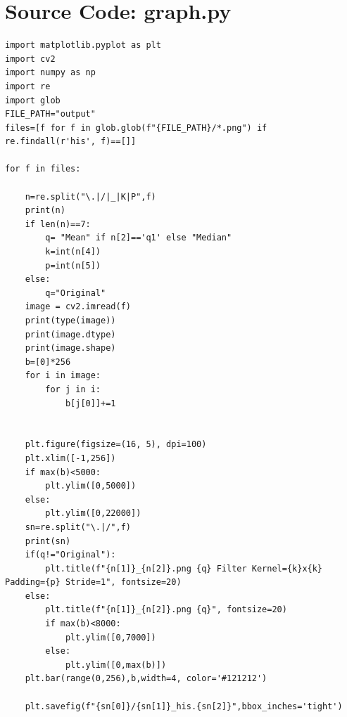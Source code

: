 \documentclass[12pt,a4paper]{report}
\begin{document}
\chapter{Source Code: graph.py}
\begin{lstlisting}
import matplotlib.pyplot as plt
import cv2
import numpy as np
import re
import glob
FILE_PATH="output"
files=[f for f in glob.glob(f"{FILE_PATH}/*.png") if re.findall(r'his', f)==[]]

for f in files:
    
    n=re.split("\.|/|_|K|P",f)
    print(n)
    if len(n)==7:
        q= "Mean" if n[2]=='q1' else "Median" 
        k=int(n[4])
        p=int(n[5])
    else:
        q="Original"
    image = cv2.imread(f)
    print(type(image))
    print(image.dtype)
    print(image.shape)
    b=[0]*256
    for i in image:
        for j in i:
            b[j[0]]+=1

    
    plt.figure(figsize=(16, 5), dpi=100)
    plt.xlim([-1,256])
    if max(b)<5000:
        plt.ylim([0,5000])
    else:
        plt.ylim([0,22000])
    sn=re.split("\.|/",f)
    print(sn)
    if(q!="Original"):
        plt.title(f"{n[1]}_{n[2]}.png {q} Filter Kernel={k}x{k} Padding={p} Stride=1", fontsize=20)
    else:
        plt.title(f"{n[1]}_{n[2]}.png {q}", fontsize=20)
        if max(b)<8000:
            plt.ylim([0,7000])
        else:
            plt.ylim([0,max(b)])
    plt.bar(range(0,256),b,width=4, color='#121212')
    
    plt.savefig(f"{sn[0]}/{sn[1]}_his.{sn[2]}",bbox_inches='tight')

\end{lstlisting}
\end{document}
